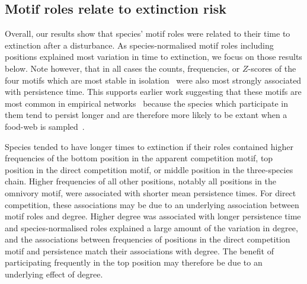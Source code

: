 \documentclass[12pt]{article}
\begin{document}
\begin{spacing}{2.0}
	\subsection*{Motif roles relate to extinction risk}

		Overall, our results show that species' motif roles were related to their time to extinction after a disturbance.
        As species-normalised motif roles including positions explained most variation in time to extinction, we focus on those results below. 
        Note however, that in all cases the counts, frequencies, or $Z$-scores of the four motifs which are most stable in isolation~\citep{Borrelli2015a} were also most strongly associated with persistence time.
        This supports earlier work suggesting that these motifs are most common in empirical networks~\citep{Stouffer2007} because the species which participate in them tend to persist longer and are therefore more likely to be extant when a food-web is sampled~\citep{Borrelli2015}.
        

        Species tended to have longer times to extinction if their roles contained higher frequencies of the bottom position in the apparent competition motif, top position in the direct competition motif, or middle position in the three-species chain.
        Higher frequencies of all other positions, notably all positions in the omnivory motif, were associated with shorter mean persistence times.
        For direct competition, these associations may be due to an underlying association between motif roles and degree. 
        Higher degree was associated with longer persistence time and species-normalised roles explained a large amount of the variation in degree, and the associations between frequencies of positions in the direct competition motif and persistence match their associations with degree.
        The benefit of participating frequently in the top position may therefore be due to an underlying effect of degree.  
        

\end{spacing}
\end{document}
